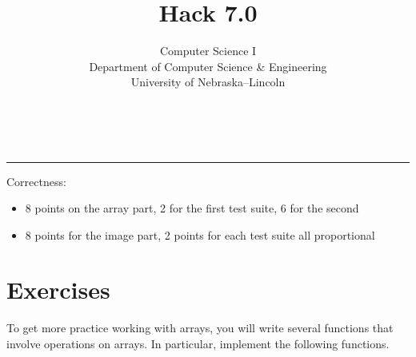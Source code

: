 \documentclass[12pt]{scrartcl}
\title{Hack 7.0}\let\Title\@title
\subtitle{Computer Science I\\
{\small
\vskip1cm
Department of Computer Science \& Engineering \\
University of Nebraska--Lincoln}
\vskip-1cm}
\date{~}
\begin{document}
\maketitle

\hrule



Correctness:
\begin{itemize}
  \item 8 points on the array part, 2 for the first test suite, 6 for the second
  \item 8 points for the image part, 2 points for each test suite all proportional
\end{itemize}

\section*{Exercises}

To get more practice working with arrays, you will write several 
functions that involve operations on arrays.  In particular, implement
the following functions.
\end{document}
